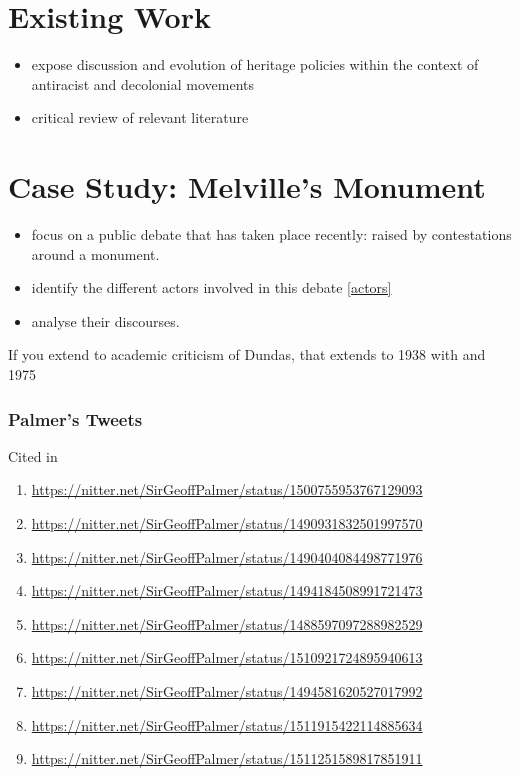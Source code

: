 \section{Existing Work}

\begin{itemize}
    \item expose discussion and evolution of heritage policies within the context of antiracist and decolonial movements
    \item critical review of relevant literature
\end{itemize}




\section{Case Study: Melville's Monument}

\begin{itemize}
    \item focus on a public debate that has taken place recently: raised by contestations around a monument. 
    \item identify the different actors involved in this debate \ref{actors}
    \item analyse their discourses. 
\end{itemize}

If you extend to academic criticism of Dundas, that extends to 1938 with \cite{williams_1938} and 1975 \cite{davis_1975}

\subsubsection{Palmer's Tweets}

Cited in \cite{mccarthy_2022_2}

\begin{enumerate}
    \item \url{https://nitter.net/SirGeoffPalmer/status/1500755953767129093}
    \item \url{https://nitter.net/SirGeoffPalmer/status/1490931832501997570}
    \item \url{https://nitter.net/SirGeoffPalmer/status/1490404084498771976}
    \item \url{https://nitter.net/SirGeoffPalmer/status/1494184508991721473}
    \item \url{https://nitter.net/SirGeoffPalmer/status/1488597097288982529}
    \item \url{https://nitter.net/SirGeoffPalmer/status/1510921724895940613}
    \item \url{https://nitter.net/SirGeoffPalmer/status/1494581620527017992}
    \item \url{https://nitter.net/SirGeoffPalmer/status/1511915422114885634}
    \item \url{https://nitter.net/SirGeoffPalmer/status/1511251589817851911}
\end{enumerate}

